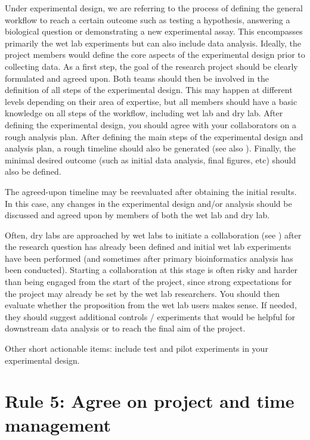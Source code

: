 \documentclass{article}
\begin{document}
Under experimental design, we are referring to the process of defining the general workflow to reach a certain outcome such as testing a hypothesis, answering a biological question or demonstrating a new experimental assay. This encompasses primarily the wet lab experiments but can also include data analysis. Ideally, the project members would define the core aspects of the experimental design prior to collecting data. As a first step, the goal of the research project should be clearly formulated and agreed upon. Both teams should then be involved in the definition of all steps of the experimental design. This may happen at different levels depending on their area of expertise, but all members should have a basic knowledge on all steps of the workflow, including wet lab and dry lab. After defining the experimental design, you should agree with your collaborators on a rough analysis plan. After defining the main steps of the experimental design and analysis plan, a rough timeline should also be generated (see also ). Finally, the minimal desired outcome (such as initial data analysis, final figures, etc) should also be defined. 

The agreed-upon timeline may be reevaluated after obtaining the initial results. In this case, any changes in the experimental design and/or analysis should be discussed and agreed upon by members of both the wet lab and dry lab. 

Often, dry labs are approached by wet labs to initiate a collaboration (see ) after the research question has already been defined and initial wet lab experiments have been performed (and sometimes after primary bioinformatics analysis has been conducted). Starting a collaboration at this stage is often risky and harder than being engaged from the start of the project, since strong expectations for the project may already be set by the wet lab researchers. You should then evaluate whether the proposition from the wet lab users makes sense. If needed, they should suggest additional controls / experiments that would be helpful for downstream data analysis or to reach the final aim of the project.

Other short actionable items: include test and pilot experiments in your experimental design.

\section*{Rule 5: Agree on project and time management} %
\label{rule5_time}
\end{document}
